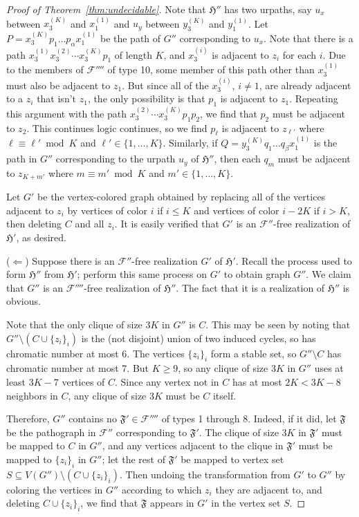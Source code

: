 \documentclass{article}
\newcommand{\Fc}{\mathcal{F}}
\newcommand{\Ff}{\mathfrak{F}}
\newcommand{\Hf}{\mathfrak{H}}
\begin{document}
\begin{proof}[Proof of Theorem~\ref{thm:undecidable}]
Note that $\Hf''$ has two urpaths, say $u_x$ between $x_3^{(K)}$ and $x_1^{(1)}$ and $u_y$ between $y_3^{(K)}$ and $y_1^{(1)}$. Let $P=x_3^{(K)}p_1\dots p_\alpha x_1^{(1)}$ be the path of $G''$ corresponding to $u_x$. Note that there is a path $x_3^{(1)}x_3^{(2)}\cdots x_3^{(K)}p_1$ of length $K$, and $x_3^{(i)}$ is adjacent to $z_i$ for each $i$. Due to the members of $\Fc''''$ of type 10, some member of this path other than $x_3^{(1)}$ must also be adjacent to $z_1$. But since all of the $x_3^{(i)}$, $i\ne 1$, are already adjacent to a $z_i$ that isn't $z_1$, the only possibility is that $p_1$ is adjacent to $z_1$. Repeating this argument with the path $x_3^{(2)}\cdots x_3^{(K)}p_1p_2$, we find that $p_2$ must be adjacent to $z_2$. This continues logic continues, so we find $p_\ell$ is adjacent to $z_{\ell'}$ where $\ell\equiv \ell'\bmod K$ and $\ell'\in\{1,\dots,K\}$. Similarly, if $Q=y_3^{(K)}q_1\dots q_\beta x_1^{(1)}$ is the path in $G''$ corresponding to the urpath $u_y$ of $\Hf''$, then each $q_m$ must be adjacent to $z_{K+m'}$ where $m\equiv m'\bmod K$ and $m'\in\{1,\dots,K\}$.

Let $G'$ be the vertex-colored graph obtained by replacing all of the vertices adjacent to $z_i$ by vertices of color $i$ if $i\le K$ and vertices of color $i-2K$ if $i > K$, then deleting $C$ and all $z_i$. It is easily verified that $G'$ is an $\Fc''$-free realization of $\Hf'$, as desired.

($\Leftarrow$) Suppose there is an $\Fc''$-free realization $G'$ of $\Hf'$. Recall the process used to form $\Hf''$ from $\Hf'$; perform this same process on $G'$ to obtain graph $G''$. We claim that $G''$ is an $\Fc''''$-free realization of $\Hf''$. The fact that it is a realization of $\Hf''$ is obvious.

Note that the only clique of size $3K$ in $G''$ is $C$. This may be seen by noting that $G''\setminus(C\cup\{z_i\}_i)$ is the (not disjoint) union of two induced cycles, so has chromatic number at most 6. The vertices $\{z_i\}_i$ form a stable set, so $G''\setminus C$ has chromatic number at most 7. But $K\ge 9$, so any clique of size $3K$ in $G''$ uses at least $3K-7$ vertices of $C$. Since any vertex not in $C$ has at most $2K<3K-8$ neighbors in $C$, any clique of size $3K$ must be $C$ itself.

Therefore, $G''$ contains no $\Ff'\in \Fc''''$ of types 1 through 8. Indeed, if it did, let $\Ff$ be the pathograph in $\Fc''$ corresponding to $\Ff'$. The clique of size $3K$ in $\Ff'$ must be mapped to $C$ in $G''$, and any vertices adjacent to the clique in $\Ff'$ must be mapped to $\{z_i\}_i$ in $G''$; let the rest of $\Ff'$ be mapped to vertex set $S\subseteq V(G'')\setminus (C\cup \{z_i\}_i)$. Then undoing the transformation from $G'$ to $G''$ by coloring the vertices in $G''$ according to which $z_i$ they are adjacent to, and deleting $C\cup \{z_i\}_i$, we find that $\Ff$ appears in $G'$ in the vertex set $S$.


\end{proof}
\end{document}
